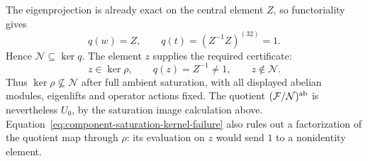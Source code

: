 The eigenprojection is already exact on the central element $Z$,
so functoriality gives
\[
 q(w)=Z,\qquad q(t)=(Z^{-1}Z)^{(32)}=1.
\]
Hence $\mathcal N\subseteq\ker q$.  The element $z$ supplies
the required certificate:
\begin{equation}\label{eq:component-saturation-kernel-failure}
 z\in\ker\rho,\qquad q(z)=Z^{-1}\ne1,
 \qquad z\notin\mathcal N.
\end{equation}
Thus $\ker\rho\nsubseteq\mathcal N$ after full ambient
saturation, with all displayed abelian modules, eigenlifts and
operator actions fixed.  The quotient
$(\mathcal F/\mathcal N)^{\rm ab}$ is nevertheless $U_0$,
by the saturation image calculation above.
Equation~\eqref{eq:component-saturation-kernel-failure} also
rules out a factorization of the quotient map through $\rho$:
its evaluation on $z$ would send $1$ to a nonidentity element.

%
